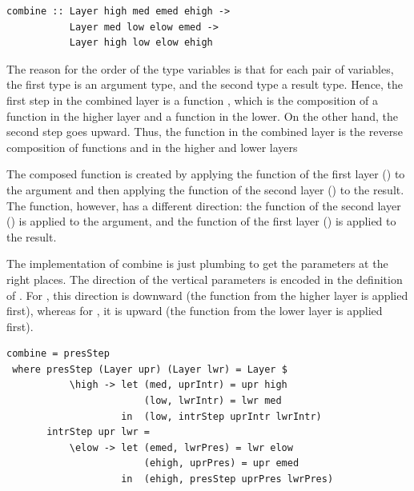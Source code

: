 \documentclass[preprint,natbib]{sigplanconf}
\begin{document}
\begin{small}
\begin{verbatim}
combine :: Layer high med emed ehigh -> 
           Layer med low elow emed -> 
           Layer high low elow ehigh
\end{verbatim}
\end{small}

The reason for the order of the type variables is that for each pair of variables, the first type is an argument type, and the second type  a result type. Hence, the first step in the combined layer is a function , which is the composition of a function  in the higher layer and a function  in the lower. On the other hand, the second step goes upward.  Thus, the function  in the combined layer is the reverse composition of functions  and  in the higher and lower layers
  
\bc The composed  function is created by applying the  function of the first layer () to the  argument and then applying the  function of the second layer () to the result. The  function, however, has a different direction: the  function of the second layer () is applied to the argument, and the  function of the first layer () is applied to the result. \ec

The implementation of combine is just plumbing to get the parameters at the right places. The direction of the vertical parameters is encoded in the definition of . \bc For , this direction is downward (the function from the higher layer is applied first), whereas for , it is upward (the function from the lower layer is applied first). \ec


\begin{small}
\begin{verbatim}
combine = presStep
 where presStep (Layer upr) (Layer lwr) = Layer $ 
           \high -> let (med, uprIntr) = upr high
                        (low, lwrIntr) = lwr med
                    in  (low, intrStep uprIntr lwrIntr)
       intrStep upr lwr = 
           \elow -> let (emed, lwrPres) = lwr elow
                        (ehigh, uprPres) = upr emed
                    in  (ehigh, presStep uprPres lwrPres)
\end{verbatim}%
\end{small}
\end{document}
